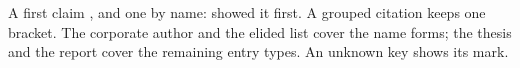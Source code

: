 \documentclass{article}
\begin{document}
A first claim \citep{roe2020}, and one by name: \citet{doe2024} showed it
first. A grouped citation \citep{poe2022, roe2020} keeps one bracket. The
corporate author \citep{corp2019} and the elided list \citet{team2021}
cover the name forms; the thesis \citep{lee2018} and the report
\citep{ray2017} cover the remaining entry types. An unknown key
\citep{ghost} shows its mark.




\end{document}
